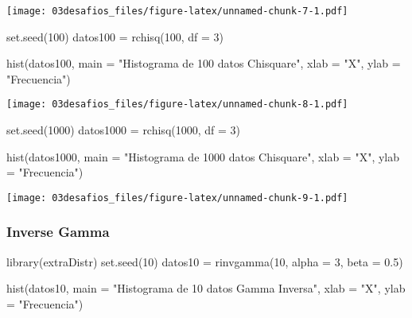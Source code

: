 \documentclass[
]{article}
\newenvironment{Shaded}{\begin{snugshade}}{\end{snugshade}}
\newcommand{\AttributeTok}[1]{\textcolor[rgb]{0.77,0.63,0.00}{#1}}
\newcommand{\DecValTok}[1]{\textcolor[rgb]{0.00,0.00,0.81}{#1}}
\newcommand{\FloatTok}[1]{\textcolor[rgb]{0.00,0.00,0.81}{#1}}
\newcommand{\FunctionTok}[1]{\textcolor[rgb]{0.00,0.00,0.00}{#1}}
\newcommand{\NormalTok}[1]{#1}
\newcommand{\OtherTok}[1]{\textcolor[rgb]{0.56,0.35,0.01}{#1}}
\newcommand{\StringTok}[1]{\textcolor[rgb]{0.31,0.60,0.02}{#1}}
\begin{document}
\texttt{[image: 03desafios\_files/figure-latex/unnamed-chunk-7-1.pdf]}

\begin{Shaded}
\begin{Highlighting}[]
\FunctionTok{set.seed}\NormalTok{(}\DecValTok{100}\NormalTok{)}
\NormalTok{datos100 }\OtherTok{=} \FunctionTok{rchisq}\NormalTok{(}\DecValTok{100}\NormalTok{, }\AttributeTok{df =} \DecValTok{3}\NormalTok{)}

\FunctionTok{hist}\NormalTok{(datos100, }\AttributeTok{main =} \StringTok{"Histograma de 100 datos Chisquare"}\NormalTok{, }\AttributeTok{xlab =} \StringTok{"X"}\NormalTok{, }\AttributeTok{ylab =} \StringTok{"Frecuencia"}\NormalTok{)}
\end{Highlighting}
\end{Shaded}

\texttt{[image: 03desafios\_files/figure-latex/unnamed-chunk-8-1.pdf]}

\begin{Shaded}
\begin{Highlighting}[]
\FunctionTok{set.seed}\NormalTok{(}\DecValTok{1000}\NormalTok{)}
\NormalTok{datos1000 }\OtherTok{=} \FunctionTok{rchisq}\NormalTok{(}\DecValTok{1000}\NormalTok{, }\AttributeTok{df =} \DecValTok{3}\NormalTok{)}

\FunctionTok{hist}\NormalTok{(datos1000, }\AttributeTok{main =} \StringTok{"Histograma de 1000 datos Chisquare"}\NormalTok{, }\AttributeTok{xlab =} \StringTok{"X"}\NormalTok{, }\AttributeTok{ylab =} \StringTok{"Frecuencia"}\NormalTok{)}
\end{Highlighting}
\end{Shaded}

\texttt{[image: 03desafios\_files/figure-latex/unnamed-chunk-9-1.pdf]}

\hypertarget{inverse-gamma-2}{%
\subsubsection{Inverse Gamma}\label{inverse-gamma-2}}

\begin{Shaded}
\begin{Highlighting}[]
\FunctionTok{library}\NormalTok{(extraDistr)}
\FunctionTok{set.seed}\NormalTok{(}\DecValTok{10}\NormalTok{)}
\NormalTok{datos10 }\OtherTok{=} \FunctionTok{rinvgamma}\NormalTok{(}\DecValTok{10}\NormalTok{, }\AttributeTok{alpha =} \DecValTok{3}\NormalTok{, }\AttributeTok{beta =} \FloatTok{0.5}\NormalTok{)}

\FunctionTok{hist}\NormalTok{(datos10, }\AttributeTok{main =} \StringTok{"Histograma de 10 datos Gamma Inversa"}\NormalTok{, }\AttributeTok{xlab =} \StringTok{"X"}\NormalTok{, }\AttributeTok{ylab =} \StringTok{"Frecuencia"}\NormalTok{)}
\end{Highlighting}
\end{Shaded}
\end{document}
